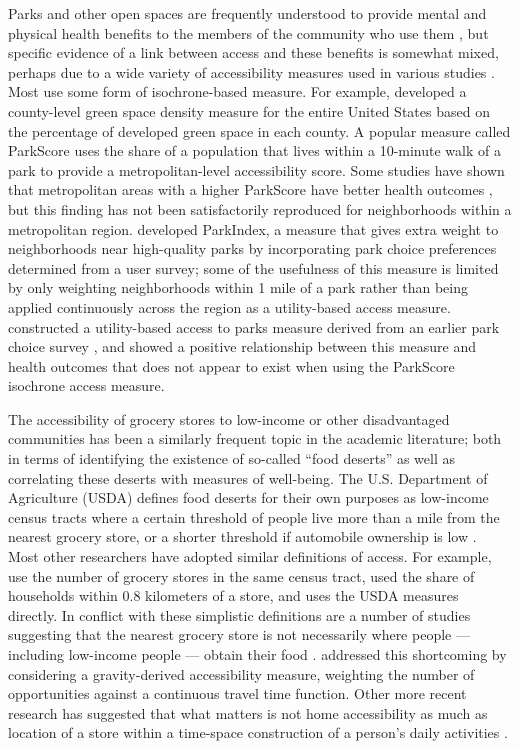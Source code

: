 \documentclass[ijerph,article,submit,moreauthors,pdftex]{mdpi}
\begin{document}
Parks and other open spaces are frequently understood to provide mental and physical
health benefits to the members of the community who use them \citep{bedimo2005}, but
specific evidence of a link between access and these benefits is somewhat mixed,
perhaps due to a wide variety of accessibility measures used in various studies
\citep{bancroft2015association}. Most use some form of isochrone-based measure. For example,
\citet{neusel2016} developed a county-level green space density measure for the entire United
States based on the percentage of developed green space in each county.
A popular measure called ParkScore \citep{parkscore2019} uses the share of a
population that lives within a 10-minute walk of a park to provide a metropolitan-level
accessibility score. Some studies have shown that metropolitan areas with a higher
ParkScore have better health outcomes \citep{rigolon2018}, but this finding has not
been satisfactorily reproduced for neighborhoods within a metropolitan region.
\citet{kacynski2016} developed ParkIndex, a
measure that gives extra weight to neighborhoods near high-quality parks by
incorporating park choice preferences determined from a user survey; some of the
usefulness of this measure is limited by only weighting neighborhoods within 1
mile of a park rather than being applied continuously across the region as a utility-based
access measure. \citet{macfarlane2020} constructed a utility-based access to parks
measure derived from an earlier park choice survey \citep{kinnell2006}, and showed a
positive relationship between this measure and health outcomes that does not
appear to exist when using the ParkScore isochrone access measure.

The accessibility of grocery stores to low-income or other disadvantaged
communities has been a similarly frequent topic in the academic literature;
both in terms of identifying the existence of so-called ``food deserts'' as well
as correlating these deserts with measures of well-being. The U.S. Department of
Agriculture (USDA) defines food deserts for their own purposes as low-income census tracts
where a certain threshold of people live more than a mile from the nearest
grocery store, or a shorter threshold if automobile ownership is low \citep{usdafara}.
Most other researchers have adopted similar definitions of access. For example,
\citet{morland2002} use the number of grocery stores in the same census tract, \citet{algert2006}
used the share of households within 0.8 kilometers of a store, and \citet{hamidi2020}
uses the USDA measures directly.
In conflict with these simplistic definitions are
a number of studies suggesting that the nearest grocery store is not necessarily
where people --- including low-income people --- obtain their food
\citep{recker1978, clifton2004, aggarwal2014}. \citet{wood2016} addressed this shortcoming
by considering a gravity-derived accessibility measure, weighting the number of
opportunities against a continuous travel time function. Other more recent research
has suggested that what matters
is not home accessibility as much as location of a store within a time-space construction
of a person's daily activities \citep{widener2015spatiotemporal, chen2021effects}.
\end{document}
